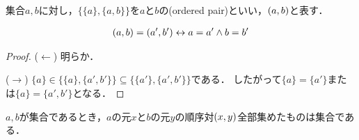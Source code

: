 \documentclass[../main.tex]{subfiles}
\begin{document}
\begin{thmbox}
\begin{definition}
集合\(a, b\)に対し，\(\{\{a\}, \{a, b\}\}\)を\(a\)と\(b\)の(ordered pair)といい，\((a, b)\)と表す．
\end{definition}
\end{thmbox}

\begin{proposition}
\begin{align*}
    (a, b) = (a', b') \leftrightarrow a = a' \land b = b'
\end{align*}
\end{proposition}

\begin{proof} (\(\leftarrow\)) 明らか．

\noindent (\(\rightarrow\))
\(\{a\} \in \{\{a\}, \{a', b'\}\} \subseteq \{\{a'\}, \{a', b'\}\}\)である．
したがって\(\{a\} = \{a'\}\)または\(\{a\} = \{a', b'\}\)となる．
\end{proof}

\begin{thmbox}
\begin{proposition}
\(a, b\)が集合であるとき，\(a\)の元\(x\)と\(b\)の元\(y\)の順序対\((x, y)\)全部集めたものは集合である．
\end{proposition}
\end{thmbox}
\end{document}

